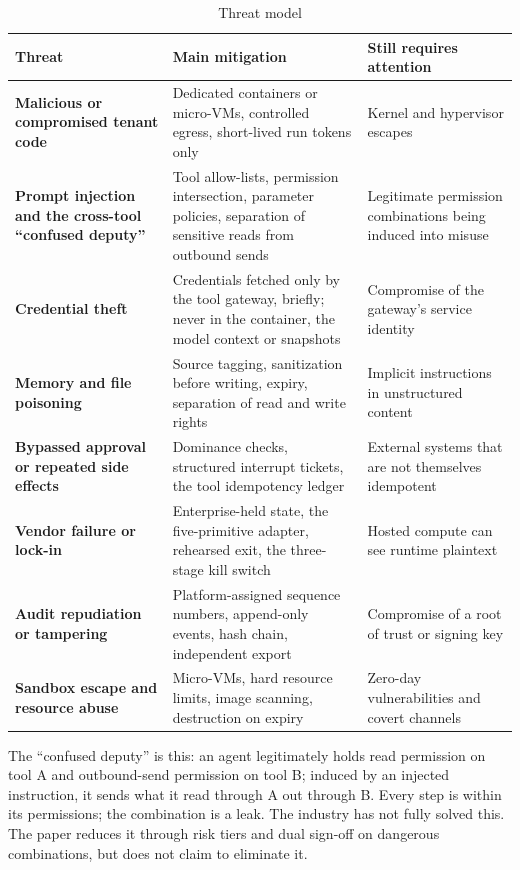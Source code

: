 \begin{table}[htbp]
\centering
\caption{Threat model}
\label{tab:threats}
\begin{tabularx}{\textwidth}{@{}>{\bfseries}L{3.4cm}L{5.6cm}Y@{}}
  \toprule
  \textbf{Threat} & \textbf{Main mitigation} & \textbf{Still requires attention}\\
  \midrule
  Malicious or compromised tenant code & Dedicated containers or micro-VMs, controlled egress, short-lived run tokens only & Kernel and hypervisor escapes\\
  Prompt injection and the cross-tool ``confused deputy'' & Tool allow-lists, permission intersection, parameter policies, separation of sensitive reads from outbound sends & Legitimate permission combinations being induced into misuse\\
  Credential theft & Credentials fetched only by the tool gateway, briefly; never in the container, the model context or snapshots & Compromise of the gateway's service identity\\
  Memory and file poisoning & Source tagging, sanitization before writing, expiry, separation of read and write rights & Implicit instructions in unstructured content\\
  Bypassed approval or repeated side effects & Dominance checks, structured interrupt tickets, the tool idempotency ledger & External systems that are not themselves idempotent\\
  Vendor failure or lock-in & Enterprise-held state, the five-primitive adapter, rehearsed exit, the three-stage kill switch & Hosted compute can see runtime plaintext\\
  Audit repudiation or tampering & Platform-assigned sequence numbers, append-only events, hash chain, independent export & Compromise of a root of trust or signing key\\
  Sandbox escape and resource abuse & Micro-VMs, hard resource limits, image scanning, destruction on expiry & Zero-day vulnerabilities and covert channels\\
  \bottomrule
\end{tabularx}
\end{table}

The ``confused deputy'' is this: an agent legitimately holds read permission on tool A and outbound-send permission on tool B; induced by an injected instruction, it sends what it read through A out through B. Every step is within its permissions; the combination is a leak. The industry has not fully solved this. The paper reduces it through risk tiers and dual sign-off on dangerous combinations, but does not claim to eliminate it.

